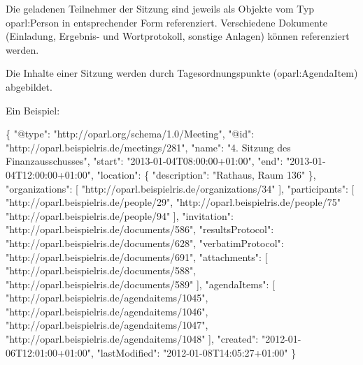 \documentclass[,a4paper]{article}
\newenvironment{Shaded}{}{}
\newcommand{\DataTypeTok}[1]{\textcolor[rgb]{0.56,0.13,0.00}{{#1}}}
\newcommand{\StringTok}[1]{\textcolor[rgb]{0.25,0.44,0.63}{{#1}}}
\newcommand{\NormalTok}[1]{{#1}}
\begin{document}
Die geladenen Teilnehmer der Sitzung sind jeweils als Objekte vom Typ
oparl:Person in entsprechender Form referenziert. Verschiedene Dokumente
(Einladung, Ergebnis- und Wortprotokoll, sonstige Anlagen) können
referenziert werden.

Die Inhalte einer Sitzung werden durch Tagesordnungspunkte
(oparl:AgendaItem) abgebildet.

Ein Beispiel:

\begin{Shaded}
\begin{Highlighting}[]
\NormalTok{\{}
    \DataTypeTok{"@type"}\NormalTok{: }\StringTok{"http://oparl.org/schema/1.0/Meeting"}\NormalTok{,}
    \DataTypeTok{"@id"}\NormalTok{: }\StringTok{"http://oparl.beispielris.de/meetings/281"}\NormalTok{,}
    \DataTypeTok{"name"}\NormalTok{: }\StringTok{"4. Sitzung des Finanzausschusses"}\NormalTok{,}
    \DataTypeTok{"start"}\NormalTok{: }\StringTok{"2013-01-04T08:00:00+01:00"}\NormalTok{,}
    \DataTypeTok{"end"}\NormalTok{: }\StringTok{"2013-01-04T12:00:00+01:00"}\NormalTok{,}
    \DataTypeTok{"location"}\NormalTok{: \{}
        \DataTypeTok{"description"}\NormalTok{: }\StringTok{"Rathaus, Raum 136"}
    \NormalTok{\},}
    \DataTypeTok{"organizations"}\NormalTok{: [}
        \StringTok{"http://oparl.beispielris.de/organizations/34"}
    \NormalTok{],}
    \DataTypeTok{"participants"}\NormalTok{: [}
        \StringTok{"http://oparl.beispielris.de/people/29"}\NormalTok{,}
        \StringTok{"http://oparl.beispielris.de/people/75"}
        \StringTok{"http://oparl.beispielris.de/people/94"}
    \NormalTok{],}
    \DataTypeTok{"invitation"}\NormalTok{: }\StringTok{"http://oparl.beispielris.de/documents/586"}\NormalTok{,}
    \DataTypeTok{"resultsProtocol"}\NormalTok{: }\StringTok{"http://oparl.beispielris.de/documents/628"}\NormalTok{,}
    \DataTypeTok{"verbatimProtocol"}\NormalTok{: }\StringTok{"http://oparl.beispielris.de/documents/691"}\NormalTok{,}
    \DataTypeTok{"attachments"}\NormalTok{: [}
        \StringTok{"http://oparl.beispielris.de/documents/588"}\NormalTok{,}
        \StringTok{"http://oparl.beispielris.de/documents/589"}
    \NormalTok{],}
    \DataTypeTok{"agendaItems"}\NormalTok{: [}
        \StringTok{"http://oparl.beispielris.de/agendaitems/1045"}\NormalTok{,}
        \StringTok{"http://oparl.beispielris.de/agendaitems/1046"}\NormalTok{,}
        \StringTok{"http://oparl.beispielris.de/agendaitems/1047"}\NormalTok{,}
        \StringTok{"http://oparl.beispielris.de/agendaitems/1048"}
    \NormalTok{],}
    \DataTypeTok{"created"}\NormalTok{: }\StringTok{"2012-01-06T12:01:00+01:00"}\NormalTok{,}
    \DataTypeTok{"lastModified"}\NormalTok{: }\StringTok{"2012-01-08T14:05:27+01:00"}
\NormalTok{\}}
\end{Highlighting}
\end{Shaded}
\end{document}
